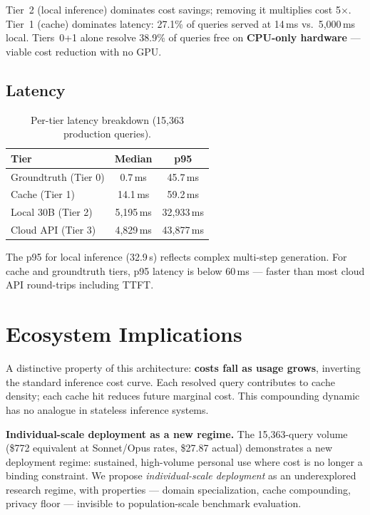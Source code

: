 \documentclass[11pt]{article}
\begin{document}
Tier~2 (local inference) dominates cost savings; removing it multiplies
cost 5$\times$. Tier~1 (cache) dominates latency: 27.1\% of queries
served at 14\,ms vs.\ 5,000\,ms local. Tiers~0+1 alone resolve 38.9\%
of queries free on \textbf{CPU-only hardware} --- viable cost reduction
with no GPU.

\subsection{Latency}

\begin{table}[t]
\centering
\small
\begin{tabular}{lcc}
\toprule
\textbf{Tier} & \textbf{Median} & \textbf{p95} \\
\midrule
Groundtruth (Tier 0) & 0.7\,ms & 45.7\,ms \\
Cache (Tier 1) & 14.1\,ms & 59.2\,ms \\
Local 30B (Tier 2) & 5,195\,ms & 32,933\,ms \\
Cloud API (Tier 3) & 4,829\,ms & 43,877\,ms \\
\bottomrule
\end{tabular}
\caption{Per-tier latency breakdown (15,363 production queries).}
\label{tab:latency}
\end{table}

The p95 for local inference (32.9\,s) reflects complex multi-step
generation. For cache and groundtruth tiers, p95 latency is below
60\,ms --- faster than most cloud API round-trips including TTFT.

\section{Ecosystem Implications}

A distinctive property of this architecture: \textbf{costs fall as
usage grows}, inverting the standard inference cost curve. Each
resolved query contributes to cache density; each cache hit reduces
future marginal cost. This compounding dynamic has no analogue in
stateless inference systems.

\textbf{Individual-scale deployment as a new regime.} The 15,363-query
volume (\$772 equivalent at Sonnet/Opus rates, \$27.87 actual)
demonstrates a new deployment regime: sustained, high-volume personal
use where cost is no longer a binding constraint. We propose
\textit{individual-scale deployment} as an underexplored research
regime, with properties --- domain specialization, cache compounding,
privacy floor --- invisible to population-scale benchmark evaluation.
\end{document}
